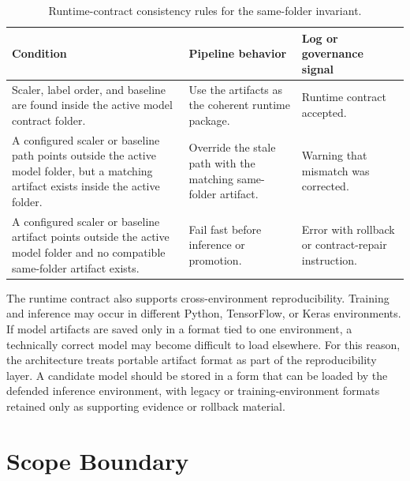\vspace{-6pt}
\renewcommand{\arraystretch}{1.18}
\begin{table}[htbp]
\centering
\footnotesize
\caption[Runtime-contract consistency rules for the same-folder invariant.]{Runtime-contract consistency rules for the same-folder invariant.}
\label{tab:runtime_contract_rules}
\begin{tabularx}{\textwidth}{p{3.7cm} X X}
\toprule
\textbf{Condition} & \textbf{Pipeline behavior} & \textbf{Log or governance signal} \\
\midrule

Scaler, label order, and baseline are found inside the active model contract folder.
& Use the artifacts as the coherent runtime package.
& Runtime contract accepted. \\

A configured scaler or baseline path points outside the active model folder, but a matching artifact exists inside the active folder.
& Override the stale path with the matching same-folder artifact.
& Warning that mismatch was corrected. \\

A configured scaler or baseline artifact points outside the active model folder and no compatible same-folder artifact exists.
& Fail fast before inference or promotion.
& Error with rollback or contract-repair instruction. \\

\bottomrule
\end{tabularx}
\renewcommand{\arraystretch}{1.0}
\end{table}

The runtime contract also supports cross-environment reproducibility. Training and inference may occur in different Python, TensorFlow, or Keras environments. If model artifacts are saved only in a format tied to one environment, a technically correct model may become difficult to load elsewhere. For this reason, the architecture treats portable artifact format as part of the reproducibility layer. A candidate model should be stored in a form that can be loaded by the defended inference environment, with legacy or training-environment formats retained only as supporting evidence or rollback material.

\section{Scope Boundary}
\label{sec:architecture_scope_boundary}

